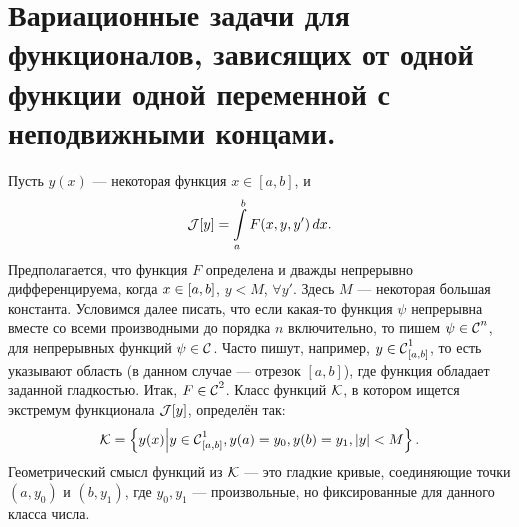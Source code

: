 \section[Задачи с неподвижными концами.]{Вариационные задачи для функционалов, зависящих от одной функции одной переменной с неподвижными концами.}
\label{lecture1section2}
Пусть $y(x)$ --- некоторая функция $x\in{[a,b]}$, и
\begin{equation*}
	\J[y]=\int\limits_a^b F(x,y,y')\,dx.
\end{equation*}
Предполагается, что функция $F$ определена и дважды непрерывно дифференцируема, когда $x\?\in[a,b]$, $y<M$, $\forall y'$. Здесь $M$ --- некоторая большая константа. Условимся далее писать, что если какая-то функция $\psi$ непрерывна вместе со всеми производными до порядка $n$ включительно, то пишем $\psi\in\Cfn[]{n}$, для непрерывных функций $\psi\in\Cfn[]{}$. Часто пишут, например, $y\in\Cfn[{[a,b]}]{1}$, то есть указывают область (в данном случае --- отрезок ${[a,b]}$), где функция обладает заданной гладкостью. Итак, $F\?\in\Cfn[]{2}$. Класс функций $\mc{K}$, в котором ищется экстремум функционала $\J[y]$, определён так:
\begin{equation*}
	\mc{K}=\left\{y(x)\middle|y\in\Cfn[{[a,b]}]{1}, y(a)=y_0, y(b)=y_1, |y|<M\right\}.
\end{equation*} 
Геометрический смысл функций из $\mc{K}$ --- это гладкие кривые, соединяющие точки $(a,y_0)$ и $(b, y_1)$, где $y_0, y_1$ --- произвольные, но фиксированные для данного класса числа.

